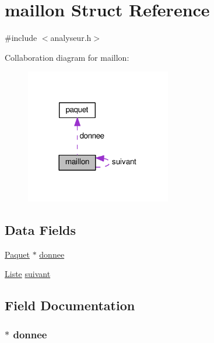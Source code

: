 \hypertarget{structmaillon}{}\section{maillon Struct Reference}
\label{structmaillon}


{\ttfamily \#include $<$analyseur.\+h$>$}



Collaboration diagram for maillon\+:
\nopagebreak
\begin{figure}[H]
\begin{center}
\leavevmode
\includegraphics[width=180pt]{structmaillon__coll__graph}
\end{center}
\end{figure}
\subsection*{Data Fields}
\begin{DoxyCompactItemize}
\item 
\hyperlink{analyseur_8h_ac588becf5702254d8163c3386192122b}{Paquet} $\ast$ \hyperlink{structmaillon_ae3dd7456da37bc9d59abf1b042b61a5d}{donnee}
\item 
\hyperlink{analyseur_8h_a59ebf944443232737291655fc0b45ff2}{Liste} \hyperlink{structmaillon_a228be6326ce187047bca162b0f8db8c3}{suivant}
\end{DoxyCompactItemize}


\subsection{Field Documentation}
\subsubsection[{\texorpdfstring{donnee}{donnee}}]{$\ast$ donnee}\hypertarget{structmaillon_ae3dd7456da37bc9d59abf1b042b61a5d}{}\label{structmaillon_ae3dd7456da37bc9d59abf1b042b61a5d}
